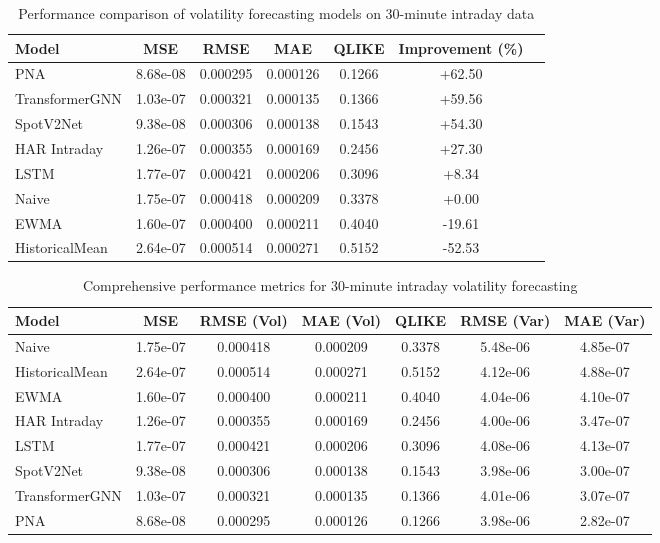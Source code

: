 \documentclass[journal]{IEEEtran}
\begin{document}
\begin{table}[!t]
\centering
\caption{Performance comparison of volatility forecasting models on 30-minute intraday data}
\label{tab:main_results}
\begin{tabular}{@{}lcccccc@{}}
\toprule
Model & MSE & RMSE & MAE & QLIKE & Improvement (\%) \\
\midrule
PNA & 8.68e-08 & 0.000295 & 0.000126 & 0.1266 & +62.50 \\
TransformerGNN & 1.03e-07 & 0.000321 & 0.000135 & 0.1366 & +59.56 \\
SpotV2Net & 9.38e-08 & 0.000306 & 0.000138 & 0.1543 & +54.30 \\
HAR Intraday & 1.26e-07 & 0.000355 & 0.000169 & 0.2456 & +27.30 \\
LSTM & 1.77e-07 & 0.000421 & 0.000206 & 0.3096 & +8.34 \\
\rowcolor{bestcolor}Naive & 1.75e-07 & 0.000418 & 0.000209 & 0.3378 & +0.00 \\
EWMA & 1.60e-07 & 0.000400 & 0.000211 & 0.4040 & -19.61 \\
HistoricalMean & 2.64e-07 & 0.000514 & 0.000271 & 0.5152 & -52.53 \\
\bottomrule
\end{tabular}
\end{table}


\begin{table*}[!t]
\centering
\caption{Comprehensive performance metrics for 30-minute intraday volatility forecasting}
\label{tab:comprehensive_results}
\begin{tabular}{@{}lS[table-format=1.2e-1]S[table-format=1.6]S[table-format=1.6]S[table-format=1.4]S[table-format=1.2e-1]S[table-format=1.2e-1]@{}}
\toprule
{Model} & {MSE} & {RMSE (Vol)} & {MAE (Vol)} & {QLIKE} & {RMSE (Var)} & {MAE (Var)} \\
\midrule
{}Naive & 1.75e-07 & 0.000418 & 0.000209 & 0.3378 & 5.48e-06 & 4.85e-07 \\
HistoricalMean & 2.64e-07 & 0.000514 & 0.000271 & 0.5152 & 4.12e-06 & 4.88e-07 \\
EWMA & 1.60e-07 & 0.000400 & 0.000211 & 0.4040 & 4.04e-06 & 4.10e-07 \\
HAR Intraday & 1.26e-07 & 0.000355 & 0.000169 & 0.2456 & 4.00e-06 & 3.47e-07 \\
LSTM & 1.77e-07 & 0.000421 & 0.000206 & 0.3096 & 4.08e-06 & 4.13e-07 \\
SpotV2Net & 9.38e-08 & 0.000306 & 0.000138 & 0.1543 & 3.98e-06 & 3.00e-07 \\
TransformerGNN & 1.03e-07 & 0.000321 & 0.000135 & 0.1366 & 4.01e-06 & 3.07e-07 \\
PNA & 8.68e-08 & 0.000295 & 0.000126 & 0.1266 & 3.98e-06 & 2.82e-07 \\
\bottomrule
\end{tabular}
\end{table*}
\end{document}
